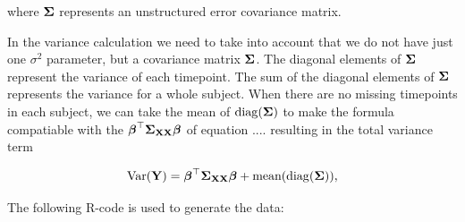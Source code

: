 \documentclass[11pt,a4paper,twoside]{book}\usepackage[]{graphicx}\usepackage[]{color}
\begin{document}
where ${\boldsymbol{\Sigma}}{}$ represents an unstructured error covariance matrix.

In the variance calculation we need to take into account that we do not have just one $\sigma^2$ parameter, but a covariance matrix ${\boldsymbol{\Sigma}}{}$. The diagonal elements of ${\boldsymbol{\Sigma}}{}$ represent the variance of each timepoint. The sum of the diagonal elements of ${\boldsymbol{\Sigma}}{}$ represents the variance for a whole subject. When there are no missing timepoints in each subject, we can  take the mean of $\operatorname{diag}({\boldsymbol{\Sigma}}{})$ to make the formula compatiable with the ${\boldsymbol{\beta}}^\top {\boldsymbol{\Sigma}}{}_{{\mathbf{X}} {\mathbf{X}}}  {\boldsymbol{\beta}}$ of equation .... resulting in the total variance term

      \begin{align} 
        \operatorname{Var}({\mathbf{Y}}) = {\boldsymbol{\beta}}^\top {\boldsymbol{\Sigma}}{}_{{\mathbf{X}} {\mathbf{X}}}  {\boldsymbol{\beta}} + \text{mean}(\operatorname{diag}({\boldsymbol{\Sigma}}{})),
   \end{align}

The following R-code is used to generate the data:
\end{document}
